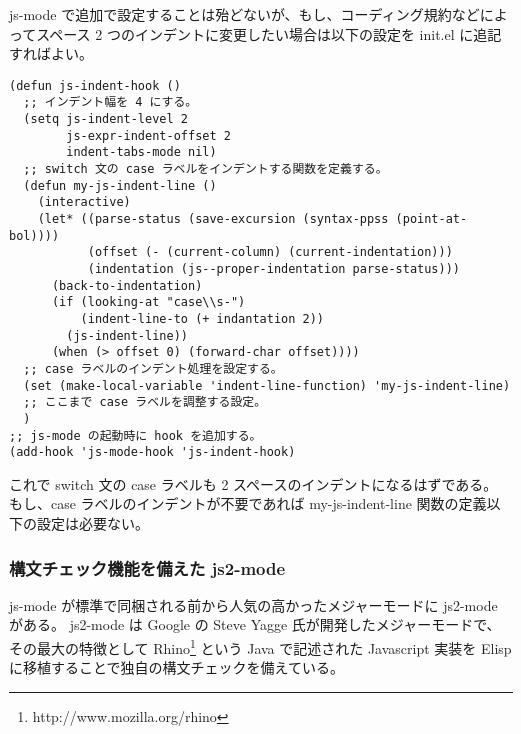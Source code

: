 js-mode で追加で設定することは殆どないが、もし、コーディング規約などによってスペース 2 つのインデントに変更したい場合は以下の設定を init.el に追記すればよい。
\begin{mdframed}[roundcorner=0.50zw,leftmargin=3.00zw,rightmargin=3.00zw,skipabove=0.40zw,skipbelow=0.40zw,innertopmargin=4.00pt,innerbottommargin=4.00pt,innerleftmargin=5.00pt,innerrightmargin=5.00pt,linecolor=gray!020,linewidth=0.50pt,backgroundcolor=gray!20]
\begin{verbatim}
(defun js-indent-hook ()
  ;; インデント幅を 4 にする。
  (setq js-indent-level 2
        js-expr-indent-offset 2
        indent-tabs-mode nil)
  ;; switch 文の case ラベルをインデントする関数を定義する。
  (defun my-js-indent-line ()
    (interactive)
    (let* ((parse-status (save-excursion (syntax-ppss (point-at-bol))))
           (offset (- (current-column) (current-indentation)))
           (indentation (js--proper-indentation parse-status)))
      (back-to-indentation)
      (if (looking-at "case\\s-")
          (indent-line-to (+ indantation 2))
        (js-indent-line))
      (when (> offset 0) (forward-char offset))))
  ;; case ラベルのインデント処理を設定する。
  (set (make-local-variable 'indent-line-function) 'my-js-indent-line)
  ;; ここまで case ラベルを調整する設定。
  )
;; js-mode の起動時に hook を追加する。
(add-hook 'js-mode-hook 'js-indent-hook)
\end{verbatim}
\end{mdframed}
これで switch 文の case ラベルも 2 スペースのインデントになるはずである。
もし、case ラベルのインデントが不要であれば my-js-indent-line 関数の定義以下の設定は必要ない。
\subsubsection{構文チェック機能を備えた js2-mode}
js-mode が標準で同梱される前から人気の高かったメジャーモードに js2-mode がある。
js2-mode は Google の Steve Yagge 氏が開発したメジャーモードで、その最大の特徴として Rhino\footnote{http://www.mozilla.org/rhino} という Java で記述された Javascript 実装を Elisp に移植することで独自の構文チェックを備えている。
